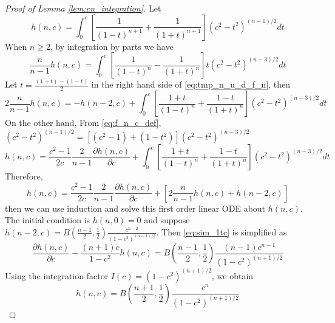 \documentclass{aptpub}
\begin{document}
\begin{proof}[Proof of Lemma \ref{lem:cn_integration}]
     Let
\begin{equation}\label{eq:f_n_c_def}
h(n,c)=   \int_0^{c}
    [\frac{1}{(1-t)^{n+1}}+\frac{1}{(1+t)^{n+1}}]
    (c^2- t^2)^{(n-1)/2}dt
\end{equation}
When $n\geq 2$, by integration by parts 
we have 
\begin{equation}\label{eq:tmp_n_u_d_f_n}
    \frac{n}{n-1}h(n,c)
    =\int_0^{c}
    \left[\frac{1}{(1-t)^{n}}
    -\frac{1}{(1+t)^{n}}
    \right]
    t(c^2- t^2)^{(n-3)/2}
    dt
\end{equation}
Let $t=\frac{(1+t)-(1-t)}{2}$ in the right hand side
of \eqref{eq:tmp_n_u_d_f_n}, then
\begin{equation}
    2\frac{n}{n-1}h(n,c)
=    -h(n-2,c)  
+ \int_0^{c}
\left[\frac{1+t}{(1-t)^{n}}
+\frac{1-t}{(1+t)^{n}}
\right]
(c^2- t^2)^{(n-3)/2}
dt
\end{equation}
On the other hand,
From \eqref{eq:f_n_c_def},
$(c^2-t^2)^{(n-1)/2}
=[(c^2-1)+(1-t^2)](c^2-t^2)^{(n-3)/2}$
\begin{equation}
    h(n, c) = \frac{c^2-1}{2c}\frac{2}{n-1}\frac{\partial h(n,c)}{\partial c}
    +  \int_0^{c}
    \left[\frac{1+t}{(1-t)^{n}}
    +\frac{1-t}{(1+t)^{n}}
    \right]
    (c^2- t^2)^{(n-3)/2}
    dt
\end{equation}
Therefore,
\begin{equation}\label{eq:sim_1tc}
    h(n,c)=\frac{c^2-1}{2c}\frac{2}{n-1}\frac{\partial h(n,c)}{\partial c}
    + [2\frac{n}{n-1} h(n,c) + h(n-2, c)]
\end{equation}
then we can use induction and solve this
first order linear ODE about $h(n,c)$.
The initial condition is $h(n,0)=0$ and
suppose
$h(n-2,c)=B(\frac{n-1}{2}, \frac{1}{2})
\frac{c^{n-2}}{(1-c^2)^{(n-1)/2}}$.
Then \eqref{eq:sim_1tc} is simplified as
\begin{equation}
    \frac{\partial h(n,c)}{\partial c}
    - \frac{(n+1)c}{1-c^2} h(n,c)
    = B(\frac{n-1}{2}, \frac{1}{2})\frac{(n-1)c^{n-1}}{(1-c^2)^{(n+1)/2}}
\end{equation}
Using the integration factor $I(c)=(1-c^2)^{(n+1)/2}$, we obtain
\begin{equation}\label{eq:f_n_c_expression}
    h(n,c)= B(\frac{n+1}{2}, \frac{1}{2})
    \frac{c^n}{(1-c^2)^{(n+1)/2}}
\end{equation}

\end{proof}
\end{document}
